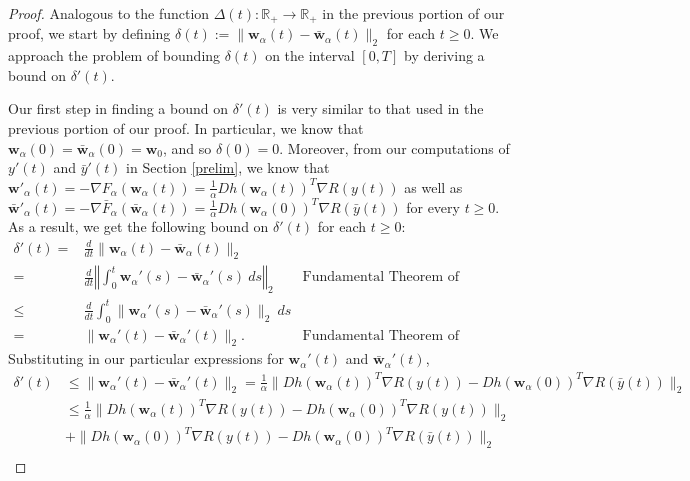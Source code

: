 \documentclass{article}
\begin{document}
\begin{proof}
Analogous to the function $\Delta(t): \mathbb{R}_+ \rightarrow 
\mathbb{R}_+$ in the previous portion of our proof, we start by defining $\delta(t) := \| \boldsymbol{w}_{\alpha}(t) - \boldsymbol{\bar{w}}_{\alpha}(t) \|_2$ for each $t \geq 0$. We approach the problem of bounding $\delta(t)$ on the interval $[0, T]$ by deriving a bound on $\delta'(t)$. 

Our first step in finding a bound on $\delta'(t)$ is very similar to that used in the previous portion of our proof. In particular, we know that $\boldsymbol{w}_{\alpha}(0) = \boldsymbol{\bar{w}}_{\alpha}(0) = \boldsymbol{w}_0$, and so $\delta(0) = 0$. Moreover, from our computations of $y'(t)$ and $\bar{y}'(t)$ in Section \ref{prelim}, we know that $\boldsymbol{w}'_{\alpha}(t) = - \nabla F_{\alpha}(\boldsymbol{w}_{\alpha}(t)) = \frac{1}{\alpha} Dh(\boldsymbol{w}_{\alpha}(t))^T \nabla R(y(t))$ as well as $\boldsymbol{\bar{w}}'_{\alpha}(t) = - \nabla \bar{F}_{\alpha}(\boldsymbol{\bar{w}}_{\alpha}(t)) = \frac{1}{\alpha} Dh(\boldsymbol{w}_{\alpha}(0))^T \nabla R(\bar{y}(t))$ for every $t \geq 0$. As a result, we get the following bound on $\delta'(t)$ for each $t \geq 0$:
\begin{align*}
    \delta'(t) =& \frac{d}{dt} \| \boldsymbol{w}_{\alpha}(t) - \boldsymbol{\bar{w}}_{\alpha}(t) \|_2\\
    =& \frac{d}{dt} \left\Vert \int_0^t \boldsymbol{w}_{\alpha}'(s) - \boldsymbol{\bar{w}}_{\alpha}'(s) \ ds \right\Vert_2  & \text{Fundamental Theorem of Calculus}\\
    \leq& \frac{d}{dt} \int_0^t \| \boldsymbol{w}_{\alpha}'(s) - \boldsymbol{\bar{w}}_{\alpha}'(s) \|_2 \ ds\\
    =& \| \boldsymbol{w}_{\alpha}'(t) - \boldsymbol{\bar{w}}_{\alpha}'(t) \|_2. & \text{Fundamental Theorem of Calculus}
\end{align*}
Substituting in our particular expressions for $\boldsymbol{w}_{\alpha}'(t)$ and $\boldsymbol{\bar{w}}_{\alpha}'(t)$, 
\begin{align*}
    \delta'(t) &\leq \| \boldsymbol{w}_{\alpha}'(t) - \boldsymbol{\bar{w}}_{\alpha}'(t) \|_2 = \frac{1}{\alpha}\|Dh(\boldsymbol{w}_{\alpha}(t))^T \nabla R(y(t)) - Dh(\boldsymbol{w}_{\alpha}(0))^T \nabla R(\bar{y}(t)) \|_2\\
    &\leq \frac{1}{\alpha}\|Dh(\boldsymbol{w}_{\alpha}(t))^T \nabla R(y(t)) -  Dh(\boldsymbol{w}_{\alpha}(0))^T \nabla R(y(t)) \|_2\\
    &+ \|Dh(\boldsymbol{w}_{\alpha}(0))^T \nabla R(y(t)) - Dh(\boldsymbol{w}_{\alpha}(0))^T \nabla R(\bar{y}(t)) \|_2\\

\end{align*}
\end{proof}
\end{document}
